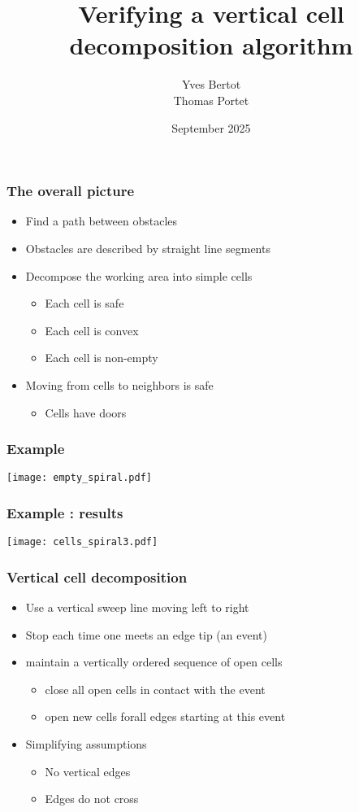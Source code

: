 \documentclass[compress]{beamer}
\title{Verifying a vertical cell decomposition algorithm}
\author{Yves Bertot\\
Thomas Portet}
\date{September 2025}
\begin{document}
\maketitle
\begin{frame}
\frametitle{The overall picture}
\begin{itemize}
\item Find a path between obstacles
\item Obstacles are described by straight line segments
\item Decompose the working area into simple cells
\begin{itemize}
\item Each cell is safe
\item Each cell is convex
\item Each cell is non-empty
\end{itemize}
\item Moving from cells to neighbors is safe
\begin{itemize}
\item Cells have doors
\end{itemize}
\end{itemize}
\end{frame}
\begin{frame}
\frametitle{Example}
\texttt{[image: empty\_spiral.pdf]}
\end{frame}
\begin{frame}
\frametitle{Example : results}
\texttt{[image: cells\_spiral3.pdf]}
\end{frame}
\begin{frame}
\frametitle{Vertical cell decomposition}
\begin{itemize}
\item Use a vertical sweep line moving left to right
\item Stop each time one meets an edge tip (an event)
\item maintain a vertically ordered sequence of open cells
\begin{itemize}
\item close all open cells in contact with the event
\item open new cells forall edges starting at this event
\end{itemize}
\item Simplifying assumptions
\begin{itemize}
\item No vertical edges
\item Edges do not cross
\end{itemize}
\end{itemize}
\end{frame}
\end{document}

